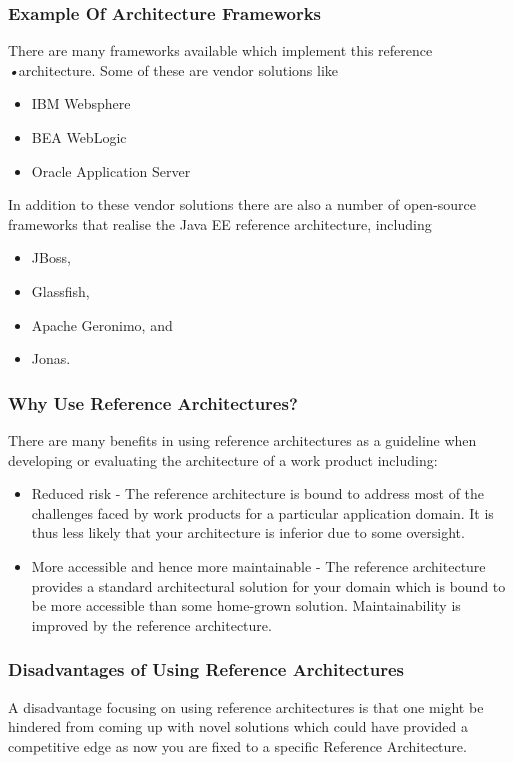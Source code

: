 \documentclass[a4paper]{article}
\begin{document}
\subsubsection{Example Of Architecture Frameworks}
There are many frameworks available which implement this reference \textsl{\textsl{•}}architecture. Some of these are vendor solutions like
\begin{itemize}
\item IBM Websphere
\item BEA WebLogic
\item Oracle Application Server
\end{itemize} 
In addition to these vendor solutions there are also a number of open-source frameworks that realise the Java EE reference architecture, including
\begin{itemize}
\item JBoss,
\item Glassfish,
\item Apache Geronimo, and
\item Jonas.
\end{itemize}
\subsubsection{Why Use Reference Architectures?}
There are many benefits in using reference architectures as a guideline when developing or evaluating the architecture of a work product including:
\begin{itemize}
\item Reduced risk - The reference architecture is bound to address most of the challenges faced by work products for a particular application domain. It is thus less likely that your architecture is inferior due to some oversight.
\item More accessible and hence more maintainable - The reference architecture provides a standard architectural solution for your domain which is bound to be more accessible than some home-grown solution. Maintainability is improved by the reference architecture.
\end{itemize}
\subsubsection{Disadvantages of Using Reference Architectures}
A disadvantage focusing on using reference architectures is that one might be hindered from coming up with novel solutions which could have provided a competitive edge as now you are fixed to a specific Reference Architecture.
\end{document}
